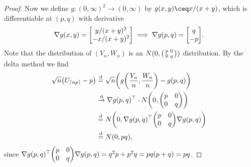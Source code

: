 \begin{proof}
    Now we define $g \colon (0, \infty)^2 \to (0, \infty)$ by $g(x, y) \ceq x / (x + y)$, which is differentiable at $(p, q)$ with derivative
    \[
    \nabla g(x, y) = \mqty[y / (x+y)^2 \\ -x / (x+y)^2] \implies \nabla g(p, q) = \mqty[ q \\ -p]. 
    \]Note that the distribution of $(V_n, W_n)$ is an $N(0, \smqty(p & 0 \\ 0 & q))$ distribution. By the delta method we find
    \begin{align*}
        \sqrt n \qty(U_{\ceil{np}} - p) &\deq \sqrt n\qty( g\qty(\frac{V_n}{n}, \frac{W_n}{n}) - g(p, q)) \\
        &\todist \nabla g(p, q)\T \cdot N\qty(0, \mqty(p & 0 \\ 0 & q)) \\
        &\deq  N\qty(0, \nabla g(p, q)\T  \mqty(p & 0 \\ 0 & q) \nabla g(p, q)) \\
        &\deq  N(0, pq),                                                                                                                                                                                                                                                                                                                                                                                                                                                                                                                                                                                                                                                                                                                                                                                                                                                                                                                                                                                                                                                                                                                                                                                                                                                                                                                                                                                                                                                                                                                                                                                                                                                                                                                                                                                                                                                                                                                                                                                                                                                                                                                                      
    \end{align*}
since $\nabla g(p, q)\T \mqty(p & 0 \\ 0 & q) \nabla g(p, q) = q^2 p + p^2 q = pq(p+q) = pq$.
\end{proof}


